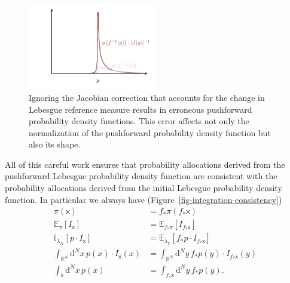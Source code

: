 \documentclass[
  letterpaper,
  DIV=11,
  numbers=noendperiod]{scrartcl}
\begin{document}
\begin{figure}

{\centering \includegraphics[width=0.5\textwidth,height=\textheight]{figures/pushforwards_density_functions/1d/incorrect/incorrect.pdf}

}

\caption{\label{fig-incorrect-density-pushforward}Ignoring the Jacobian
correction that accounts for the change in Lebesgue reference measure
results in erroneous pushforward probability density functions. This
error affects not only the normalization of the pushforward probability
density function but also its shape.}

\end{figure}

All of this careful work ensures that probability allocations derived
from the pushforward Lebesgue probability density function are
consistent with the probability allocations derived from the initial
Lebesgue probability density function. In particular we always have
(Figure~\ref{fig-integration-consistency}) \begin{align*}
\pi( \mathsf{x} ) &= f_{*} \pi ( f_{*} \mathsf{x} )
\\
\mathbb{E}_{\pi} [ I_{\mathsf{x}} ]
&=
\mathbb{E}_{f_{*} \pi} [ I_{f_{*} \mathsf{x}} ]
\\
\mathbb{I}_{\lambda_{X}} [ p \cdot I_{\mathsf{x}} ]
&=
\mathbb{E}_{\lambda_{Y}} [ f_{*} p \cdot I_{f_{*} \mathsf{x}} ]
\\
\int_{\mathbb{R}^{N}} \mathrm{d}^{N} x \,
p(x) \cdot I_{\mathsf{x}}(x)
&=
\int_{\mathbb{R}^{N}} \mathrm{d}^{N} y \,
f_{*} p(y) \cdot I_{f_{*} \mathsf{x}}(y)
\\
\int_{\mathsf{x}} \mathrm{d}^{N} x \, p(x)
&=
\int_{f_{*} \mathsf{x}} \mathrm{d}^{N} y \, f_{*} p(y).
\end{align*}
\end{document}
